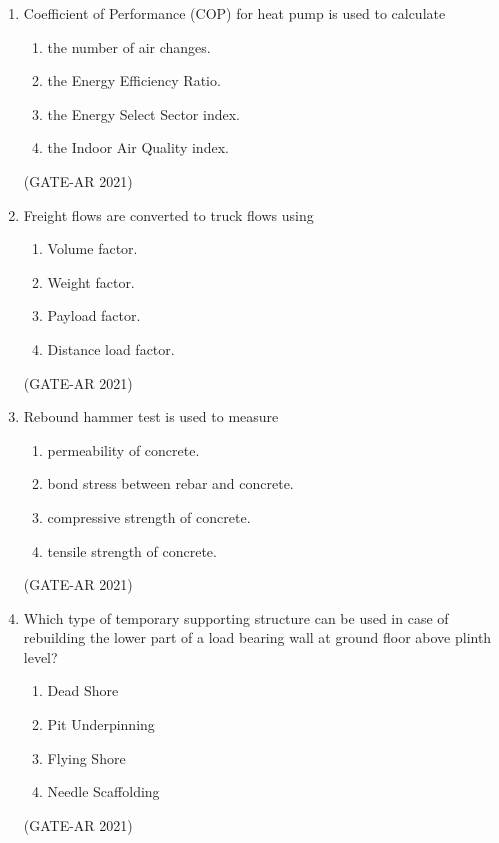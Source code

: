 \documentclass[a4paper,10pt]{article}
\begin{document}
\begin{enumerate}
    \item Coefficient of Performance (COP) for heat pump is used to calculate 
    \begin{enumerate}
        \item the number of air changes.
        \item the Energy Efficiency Ratio.
        \item the Energy Select Sector index.
        \item the Indoor Air Quality index.
    \end{enumerate}
    \hfill (GATE-AR 2021)

    \item Freight flows are converted to truck flows using 
    \begin{multicols}{2}
    \begin{enumerate}
        \item Volume factor.
        \item Weight factor.
        \item Payload factor.
        \item Distance load factor.
    \end{enumerate}
    \end{multicols}
    \hfill (GATE-AR 2021)

    \item Rebound hammer test is used to measure 
    \begin{enumerate}
        \item permeability of concrete.
        \item bond stress between rebar and concrete.
        \item compressive strength of concrete.
        \item tensile strength of concrete.
    \end{enumerate}
    \hfill (GATE-AR 2021)

    \item Which type of temporary supporting structure can be used in case of rebuilding the lower part of a load bearing wall at ground floor above plinth level? 
    \begin{multicols}{2}
    \begin{enumerate}
        \item Dead Shore
        \item Pit Underpinning
        \item Flying Shore
        \item Needle Scaffolding
    \end{enumerate}
    \end{multicols}
    \hfill (GATE-AR 2021)


\end{enumerate}
\end{document}
